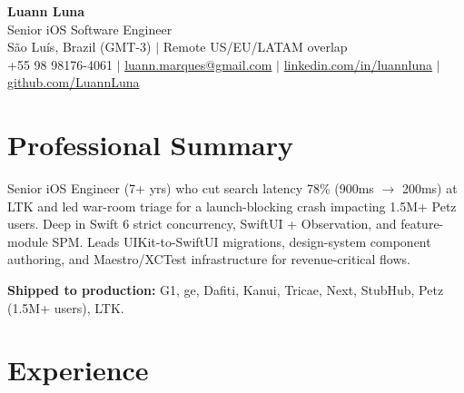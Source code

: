 \documentclass[11pt,letterpaper]{article}
\begin{document}
\begin{center}
    {\LARGE \textbf{Luann Luna}} \\
    \vspace{0.5em}
    Senior iOS Software Engineer \\
    \vspace{0.2em}
    São Luís, Brazil (GMT-3) $|$ Remote US/EU/LATAM overlap \\
    \vspace{0.3em}
    +55 98 98176-4061 $|$
    \href{mailto:luann.marques@gmail.com}{luann.marques@gmail.com} $|$
    \href{https://linkedin.com/in/luannluna}{linkedin.com/in/luannluna} $|$
    \href{https://github.com/LuannLuna}{github.com/LuannLuna}
\end{center}

\vspace{0.5em}

\section*{Professional Summary}
Senior iOS Engineer (7+ yrs) who cut search latency 78\% (900ms $\rightarrow$ 200ms) at LTK and led war-room triage for a launch-blocking crash impacting 1.5M+ Petz users. Deep in Swift 6 strict concurrency, SwiftUI + Observation, and feature-module SPM. Leads UIKit-to-SwiftUI migrations, design-system component authoring, and Maestro/XCTest infrastructure for revenue-critical flows.

\vspace{0.35em}
\noindent\textbf{Shipped to production:} G1, ge, Dafiti, Kanui, Tricae, Next, StubHub, Petz (1.5M+ users), LTK.

\section*{Experience}
\end{document}
